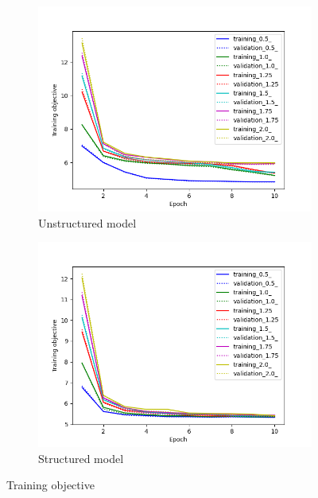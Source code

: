 \begin{figure}
    \centering
    \begin{subfigure}[b]{0.47\textwidth}
        \centering
        \includegraphics[width=1.1\textwidth]{figs/unstructured_obj.png}
        \caption{Unstructured model}
        \label{fig:unstr_obj}
    \end{subfigure}
    \hfill
    \begin{subfigure}[b]{0.47\textwidth}
        \centering
        \includegraphics[width=1.1\textwidth]{figs/structured_obj.png}
        \caption{Structured model}
        \label{fig:str_obj}
    \end{subfigure}
    \caption{Training objective}
    \label{fig:obj}
\end{figure}

